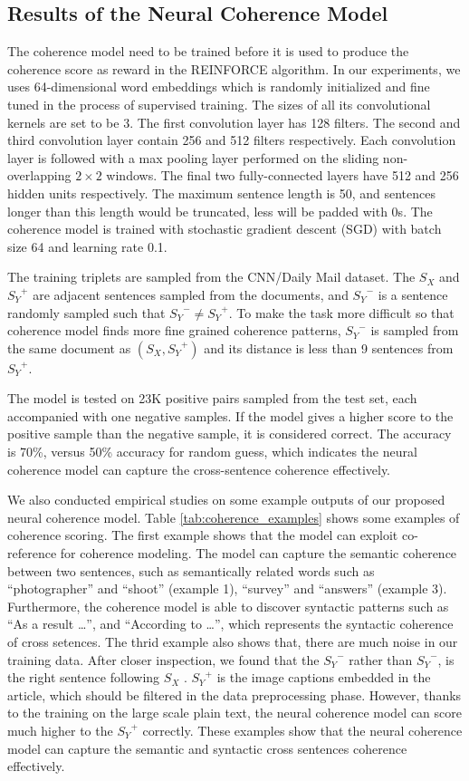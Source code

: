 \documentclass[letterpaper]{article} %
\begin{document}
	\subsection{Results of the Neural Coherence Model}
	The coherence model need to be trained before it is used to produce the coherence score as reward in the REINFORCE algorithm. In our experiments,  we uses 64-dimensional word embeddings which is randomly initialized and fine tuned in the process of supervised training. The sizes of all its convolutional kernels are set to be 3. The first convolution layer has 128 filters. The second and third convolution layer contain 256 and 512 filters respectively. Each convolution layer is followed with a max pooling layer performed on the sliding non-overlapping $2\times 2$ windows.  The final two fully-connected layers have 512 and 256 hidden units respectively. The maximum sentence length is 50, and sentences longer than this length would be truncated, less will be padded with 0s. The coherence model is trained with stochastic gradient descent (SGD) with batch size 64 and learning rate 0.1. 


	The training triplets are sampled from the CNN/Daily Mail dataset. The $S_X$ and ${S_Y}^{+}$ are adjacent sentences sampled from the documents, and ${S_Y}^{-}$ is a sentence randomly sampled such that ${S_Y}^{-} \neq {S_Y}^{+}$. To make the task more difficult so that coherence model finds more fine grained coherence patterns, ${S_Y}^{-}$ is sampled from the same document as $(S_X, {S_Y}^{+})$ and its distance is less than 9 sentences from ${S_Y}^{+}$.
	
	The model is tested on 23K positive pairs sampled from the test set, each accompanied with one negative samples. If the model gives a higher score to the positive sample than the negative sample, it is considered correct. The accuracy is 70\%, versus 50\% accuracy for random guess, which indicates the neural coherence model can capture the cross-sentence coherence effectively.
	
	We also conducted empirical studies on some  example outputs of  our proposed neural coherence model. Table \ref{tab:coherence_examples} shows some examples of coherence scoring. The first example shows that the model can exploit co-reference for coherence modeling. The model can capture the semantic coherence between two sentences, such as semantically related words such as ``photographer'' and ``shoot'' (example 1), ``survey'' and ``answers'' (example 3). Furthermore, the coherence model is able to discover syntactic patterns such as ``As a result \dots'', and ``According to \dots'', which represents the syntactic coherence of cross setences. The thrid example also shows that, there are much noise in our training data. After closer inspection, we found that the ${S_Y}^{-}$ rather than ${S_Y}^{-}$,  is the right sentence following ${S_X}$ . ${S_Y}^{+}$ is the image captions embedded in the article, which should be filtered in the data preprocessing phase. However, thanks to the training on the large scale plain text, the neural coherence model can score much higher to the ${S_Y}^{+}$ correctly. These examples show that the neural coherence model can capture the semantic and syntactic cross sentences coherence effectively. 
\end{document}
